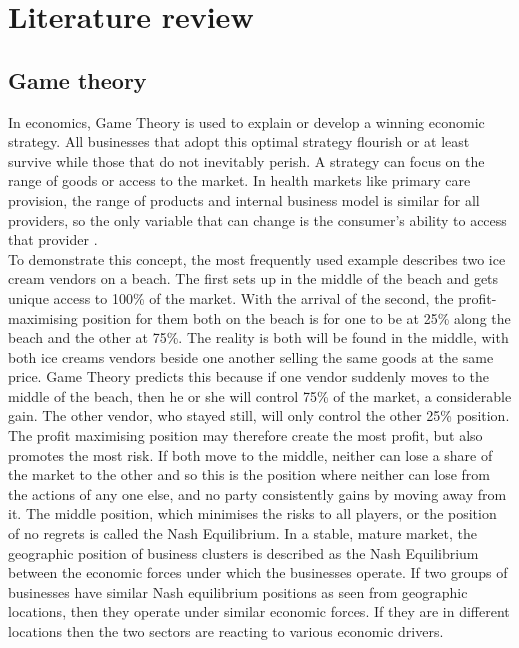 \documentclass[11pt,a4paper]{article}
\begin{document}
\section{Literature review}
\subsection{Game theory}
In economics, Game Theory is used to explain or develop a winning economic strategy. All businesses that adopt this optimal strategy flourish or at least survive while those that do not inevitably perish. A strategy can focus on the range of goods or access to the market. In health markets like primary care provision, the range of products and internal business model is similar for all providers, so the  only variable that can change is the consumer's ability to access that provider \citep{dinar2008game}. \\


To demonstrate this concept, the most frequently used example describes two ice cream vendors on a beach. The first sets up in the middle of the beach and gets unique access to 100\% of the market. With the arrival of the second, the profit-maximising position for them both on the beach is for one to be at 25\% along the beach and the other at 75\%. The reality is both will be found in the middle, with both ice creams vendors beside one another selling the same goods at the same price. Game Theory predicts this because if one vendor suddenly moves to the middle of the beach, then he or she will control 75\% of the market, a considerable gain. The other vendor, who stayed still, will only control the other 25\% position. The profit maximising position may therefore create the most profit, but also promotes the most risk. If both move to the middle, neither can lose a share of the market to the other and so this is the position where neither can lose from the actions of any one else, and no party consistently gains by moving away from it. The middle position, which minimises the risks to all players, or the position of no regrets is called the Nash Equilibrium. In a stable, mature market, the geographic position of business clusters is described as the Nash Equilibrium between the economic forces under which the businesses operate. If two groups of businesses have similar Nash equilibrium positions as seen from geographic locations, then they operate under similar economic forces. If they are in different locations then the two sectors are reacting to various economic drivers. \\
\end{document}
